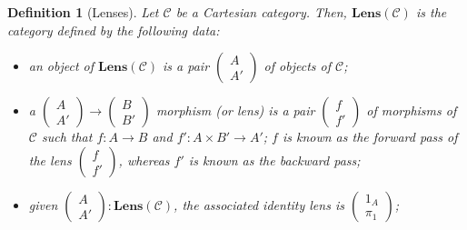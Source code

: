 \documentclass[11pt,a4paper,openright,twoside]{report}
\newcounter{mycounter}
\theoremstyle{plain}
\newtheorem{definition}[mycounter]{Definition}
\theoremstyle{definition}
\begin{document}
\begin{definition}[Lenses]
  \label{def: lenses}
  Let $\mathcal{C}$ be a Cartesian category. Then, $\mathbf{Lens}(\mathcal{C})$ is the category defined by the following data:
  \begin{itemize}
    \item an object of $\mathbf{Lens}(\mathcal{C})$ is a pair $\left(\begin{smallmatrix} A \\ A' \end{smallmatrix}\right)$ of objects of $\mathcal{C}$; 
    
    \item a $\left(\begin{smallmatrix} A \\ A' \end{smallmatrix}\right) \to \left(\begin{smallmatrix} B \\ B' \end{smallmatrix}\right)$ morphism (or lens) is a pair $\left(\begin{smallmatrix} f \\ f' \end{smallmatrix}\right)$ of morphisms of $\mathcal{C}$ such that $f: A \to B$ and $f': A \times B' \to A'$; $f$ is known as the forward pass of the lens $\left(\begin{smallmatrix} f \\ f' \end{smallmatrix}\right)$, whereas $f'$ is known as the backward pass;
    
    \item given $\left(\begin{smallmatrix} A \\ A' \end{smallmatrix}\right) : \mathbf{Lens}(\mathcal{C})$, the associated identity lens is $\left(\begin{smallmatrix} 1_A \\ \pi_1 \end{smallmatrix}\right)$;
    

\end{itemize}
\end{definition}
\end{document}
